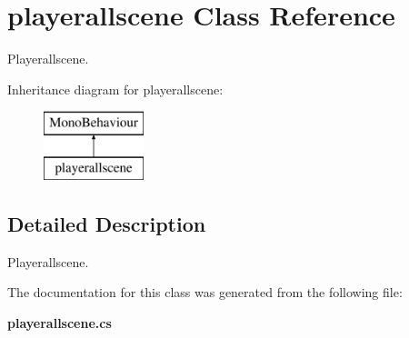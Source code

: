 \section{playerallscene Class Reference}
\label{classplayerallscene}


Playerallscene.  


Inheritance diagram for playerallscene\+:\begin{figure}[H]
\begin{center}
\leavevmode
\includegraphics[height=2.000000cm]{classplayerallscene}
\end{center}
\end{figure}


\subsection{Detailed Description}
Playerallscene. 



The documentation for this class was generated from the following file\+:\begin{DoxyCompactItemize}
\item 
{\bf playerallscene.\+cs}\end{DoxyCompactItemize}

